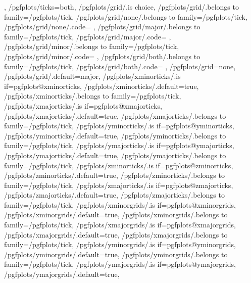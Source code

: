{{	},
	/pgfplots/ticks=both,
	/pgfplots/grid/.is choice,
	/pgfplots/grid/.belongs to family=/pgfplots/tick,
	/pgfplots/grid/none/.belongs to family=/pgfplots/tick,
	/pgfplots/grid/none/.code={%
		\pgfplots@xminorgridsfalse
		\pgfplots@yminorgridsfalse
		\pgfplots@zminorgridsfalse
		\pgfplots@xmajorgridsfalse
		\pgfplots@ymajorgridsfalse
		\pgfplots@zmajorgridsfalse
	},
	/pgfplots/grid/major/.belongs to family=/pgfplots/tick,
	/pgfplots/grid/major/.code={%
		\pgfplots@xminorgridsfalse
		\pgfplots@yminorgridsfalse
		\pgfplots@zminorgridsfalse
		\pgfplots@xmajorgridstrue
		\pgfplots@ymajorgridstrue
		\pgfplots@zmajorgridstrue
	},
	/pgfplots/grid/minor/.belongs to family=/pgfplots/tick,
	/pgfplots/grid/minor/.code={%
		\pgfplots@xminorgridstrue
		\pgfplots@yminorgridstrue
		\pgfplots@zminorgridstrue
		\pgfplots@xmajorgridsfalse
		\pgfplots@ymajorgridsfalse
		\pgfplots@zmajorgridsfalse
	},
	/pgfplots/grid/both/.belongs to family=/pgfplots/tick,
	/pgfplots/grid/both/.code={%
		\pgfplots@xminorgridstrue
		\pgfplots@yminorgridstrue
		\pgfplots@zminorgridstrue
		\pgfplots@xmajorgridstrue
		\pgfplots@ymajorgridstrue
		\pgfplots@zmajorgridstrue
	},
	/pgfplots/grid=none,
	/pgfplots/grid/.default=major,
	/pgfplots/xminorticks/.is if=pgfplots@xminorticks,
	/pgfplots/xminorticks/.default=true,
	/pgfplots/xminorticks/.belongs to family=/pgfplots/tick,
	/pgfplots/xmajorticks/.is if=pgfplots@xmajorticks,
	/pgfplots/xmajorticks/.default=true,
	/pgfplots/xmajorticks/.belongs to family=/pgfplots/tick,
	/pgfplots/yminorticks/.is if=pgfplots@yminorticks,
	/pgfplots/yminorticks/.default=true,
	/pgfplots/yminorticks/.belongs to family=/pgfplots/tick,
	/pgfplots/ymajorticks/.is if=pgfplots@ymajorticks,
	/pgfplots/ymajorticks/.default=true,
	/pgfplots/ymajorticks/.belongs to family=/pgfplots/tick,
	/pgfplots/zminorticks/.is if=pgfplots@zminorticks,
	/pgfplots/zminorticks/.default=true,
	/pgfplots/zminorticks/.belongs to family=/pgfplots/tick,
	/pgfplots/zmajorticks/.is if=pgfplots@zmajorticks,
	/pgfplots/zmajorticks/.default=true,
	/pgfplots/zmajorticks/.belongs to family=/pgfplots/tick,
	/pgfplots/xminorgrids/.is if=pgfplots@xminorgrids,
	/pgfplots/xminorgrids/.default=true,
	/pgfplots/xminorgrids/.belongs to family=/pgfplots/tick,
	/pgfplots/xmajorgrids/.is if=pgfplots@xmajorgrids,
	/pgfplots/xmajorgrids/.default=true,
	/pgfplots/xmajorgrids/.belongs to family=/pgfplots/tick,
	/pgfplots/yminorgrids/.is if=pgfplots@yminorgrids,
	/pgfplots/yminorgrids/.default=true,
	/pgfplots/yminorgrids/.belongs to family=/pgfplots/tick,
	/pgfplots/ymajorgrids/.is if=pgfplots@ymajorgrids,
	/pgfplots/ymajorgrids/.default=true,
}
